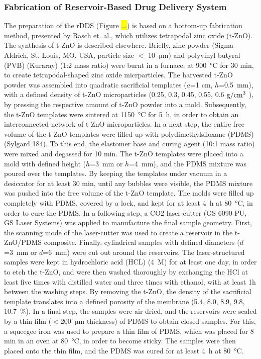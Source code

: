 \subsubsection{Fabrication of Reservoir-Based Drug Delivery System}

The preparation of the rDDS (Figure \hl{...}) is based on a bottom-up fabrication method, presented by Rasch et. al.\supercite{rasch2020macroscopic}, which utilizes tetrapodal zinc oxide (t-ZnO). The synthesis of t-ZnO is described elsewhere\supercite{mishra2013fabrication,mishra2015direct}. Briefly, zinc powder (Sigma-Aldrich, St. Louis, MO, USA, particle size $<$ 10~µm) and polyvinyl butyral (PVB) (Kuraray) (1:2 mass ratio) were burnt in a furnace, at 900~°C for 30 min, to create tetrapodal-shaped zinc oxide micrparticles. The harvested t-ZnO powder was assembled into quadratic sacrificial templates ($a$=1 cm, $h$=0.5~mm), with a defined density of t-ZnO microparticles (0.25, 0.3, 0.45, 0.55, 0.6 ${\rm g/cm^3}$ ), by pressing the respective amount of t-ZnO powder into a mold. Subsequently, the t-ZnO templates were sintered at 1150~°C for 5~h, in order to obtain an interconnected network of t-ZnO microparticles. In a next step, the entire free volume of the t-ZnO templates were filled up with polydimethylsiloxane (PDMS) (Sylgard 184). To this end, the elastomer base and curing agent (10:1 mass ratio) were mixed and degassed for 10 min. The t-ZnO templates were placed into a mold with defined height ($h$=3~mm or $h$=4~mm), and the PDMS mixture was poured over the templates. By keeping the templates under vacuum in a desiccator for at least 30 min, until any bubbles were visible, the PDMS mixture was pushed into the free volume of the t-ZnO template. The molds were filled up completely with PDMS, covered by a lock, and kept for at least 4~h at 80~°C, in order to cure the PDMS. In a following step, a CO2 laser-cutter (GS 6090 PU, GS Laser Systems) was applied to manufacture the final sample geometry. First, the scanning mode of the laser-cutter was used to create a reservoir in the t-ZnO/PDMS composite. Finally, cylindrical samples with defined diameters ($d$=3~mm or $d$=6~mm) were cut out around the reservoirs. The laser-structured samples were kept in hydrochloric acid (HCL) (4~M) for at least one day, in order to etch the t-ZnO, and were then washed thoroughly by exchanging the HCl at least five times with distilled water and three times with ethanol, with at least 1h between the washing steps. By removing the t-ZnO, the density of the sacrificial template translates into a defined porosity of the membrane (5.4, 8.0, 8.9, 9.8, 10.7~\%). In a final step, the samples were air-dried, and the reservoirs were sealed by a thin film ($<$200~µm thickness) of PDMS to obtain closed samples. For this, a squeegee iron was used to prepare a thin film of PDMS, which was placed for 8 min in an oven at 80~°C, in order to become sticky. The samples were then placed onto the thin film, and the PDMS was cured for at least 4~h at 80~°C.

